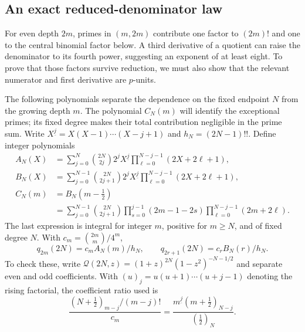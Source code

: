 \subsection{An exact reduced-denominator law}
For even depth $2m$, primes in $(m,2m)$ contribute one factor to
$(2m)!$ and one to the central binomial factor below. A third
derivative of a quotient can raise the denominator to its fourth
power, suggesting an exponent of at least eight. To prove that
those factors survive reduction, we must also show that the relevant
numerator and first derivative are $p$-units.

The following polynomials separate the dependence on the fixed endpoint
$N$ from the growing depth $m$. The polynomial $C_N(m)$ will identify
the exceptional primes; its fixed degree makes their total contribution
negligible in the prime sum.
Write $X^{\underline j}=X(X-1)\cdots(X-j+1)$ and $h_N=(2N-1)!!$.
Define integer polynomials
\begin{align*}
 A_N(X)&=\sum_{j=0}^N\binom{2N}{2j}2^jX^{\underline j}
                    \prod_{\ell=0}^{N-j-1}(2X+2\ell+1),\\
 B_N(X)&=\sum_{j=0}^{N-1}\binom{2N}{2j+1}2^jX^{\underline j}
                    \prod_{\ell=0}^{N-j-1}(2X+2\ell+1),\\
 C_N(m)&=B_N(m-\tfrac12)\\
 &=\sum_{j=0}^{N-1}\binom{2N}{2j+1}
       \prod_{s=0}^{j-1}(2m-1-2s)
       \prod_{\ell=0}^{N-j-1}(2m+2\ell).
\end{align*}
The last expression is integral for integer $m$, positive for $m\geq N$,
and of fixed degree $N$. With $c_m=\binom{2m}{m}/4^m$,
\begin{equation}\label{eq:cf-parity}
 q_{2m}(2N)=c_m A_N(m)/h_N,\qquad
 q_{2r+1}(2N)=c_r B_N(r)/h_N.
\end{equation}
To check these, write
$\mathcal Q(2N,z)=(1+z)^{2N}(1-z^2)^{-N-1/2}$ and separate
even and odd coefficients. With $(u)_j=u(u+1)\cdots(u+j-1)$
denoting the rising factorial, the coefficient ratio used is
\[
 \frac{(N+\tfrac12)_{m-j}/(m-j)!}{c_m}
 =\frac{m^{\underline j}(m+\tfrac12)_{N-j}}{(\tfrac12)_N}.
\]


